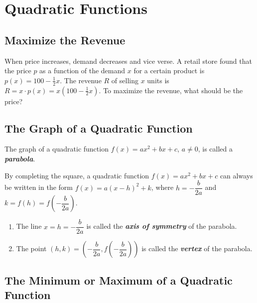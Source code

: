 
\hypertarget{quadratic-functions}{%
\section{Quadratic Functions}\label{quadratic-functions}}

\hypertarget{maximize-the-revenue}{%
\subsection{Maximize the Revenue}\label{maximize-the-revenue}}

When price increases, demand decreases and vice verse. A retail store
found that the price \(p\) as a function of the demand \(x\) for a
certain product is \(p(x)=100-\frac12 x\). The revenue \(R\) of selling
\(x\) units is \(R=x\cdot p(x)=x(100-\frac12x)\). To maximize the
revenue, what should be the price?

\hypertarget{the-graph-of-a-quadratic-function}{%
\subsection{The Graph of a Quadratic
Function}\label{the-graph-of-a-quadratic-function}}

The graph of a quadratic function \(f(x)=ax^2+bx+c\), \(a\neq 0\), is
called a \textbf{\emph{parabola}}.

By completing the square, a quadratic function \(f(x)=ax^2+bx+c\) can
always be written in the form \(f(x)=a(x-h)^2+k\), where
\(h=-\dfrac{b}{2a}\) and \(k=f(h)=f\left(-\dfrac{b}{2a}\right)\).

\begin{enumerate}[sepno]
\item
  The line \(x=h=-\dfrac{b}{2a}\) is called the \textbf{\emph{axis of
  symmetry}} of the parabola.
\item
  The point
  \((h, k)=\left(-\dfrac{b}{2a}, f\left(-\dfrac{b}{2a}\right)\right)\)
  is called the \textbf{\emph{vertex}} of the parabola.
\end{enumerate}

\hypertarget{the-minimum-or-maximum-of-a-quadratic-function}{%
\subsection{The Minimum or Maximum of a Quadratic
Function}\label{the-minimum-or-maximum-of-a-quadratic-function}}

